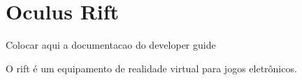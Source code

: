 \section{Oculus Rift} %
\label{sec:oculus_rift}

Colocar aqui a documentacao do developer guide

O \gls{rift}  é um equipamento de realidade virtual para jogos eletrônicos.

